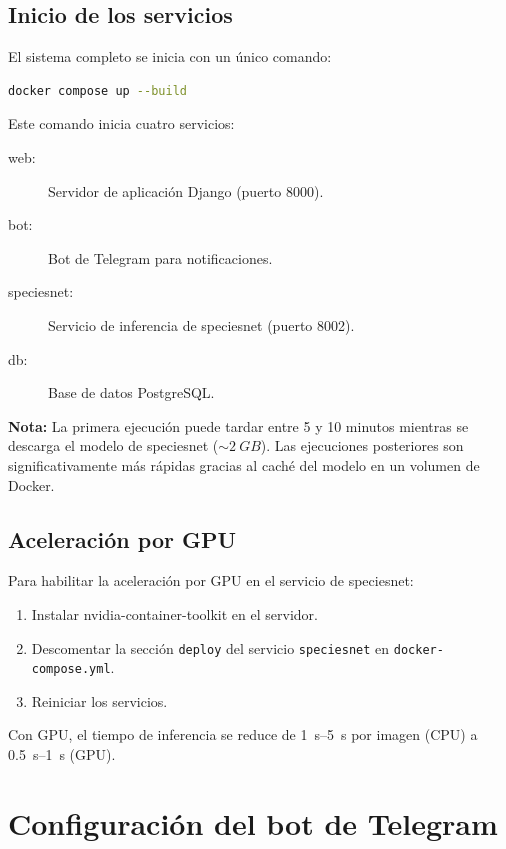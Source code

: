 \documentclass[a4paper, 12pt]{report}
\begin{document}
\subsection{Inicio de los servicios}

El sistema completo se inicia con un único comando:

\begin{lstlisting}[language=bash, caption={Inicio de los servicios con Docker Compose.}]
  docker compose up --build
\end{lstlisting}

Este comando inicia cuatro servicios:

\begin{description}
  \item[web:] Servidor de aplicación Django (puerto 8000).
  \item[bot:] Bot de Telegram para notificaciones.
  \item[speciesnet:] Servicio de inferencia de \gls{speciesnet}
    (puerto 8002).
  \item[db:] Base de datos PostgreSQL.
\end{description}

\textbf{Nota:} La primera ejecución puede tardar entre 5 y 10 minutos
mientras se descarga el modelo de \gls{speciesnet} ($\sim \qty{2}{GB}$). Las
ejecuciones posteriores son significativamente más rápidas gracias al
caché del modelo en un volumen de Docker.

\subsection{Aceleración por GPU}

Para habilitar la aceleración por GPU en el servicio de \gls{speciesnet}:

\begin{enumerate}
  \item Instalar nvidia-container-toolkit en el servidor.
  \item Descomentar la sección \texttt{deploy} del servicio
    \texttt{speciesnet} en \texttt{docker-compose.yml}.
  \item Reiniciar los servicios.
\end{enumerate}

Con GPU, el tiempo de inferencia se reduce de \qtyrange{1}{5}{s} por imagen
(CPU) a \qtyrange{0.5}{1}{s} (GPU).

\section{Configuración del bot de Telegram}
\end{document}
